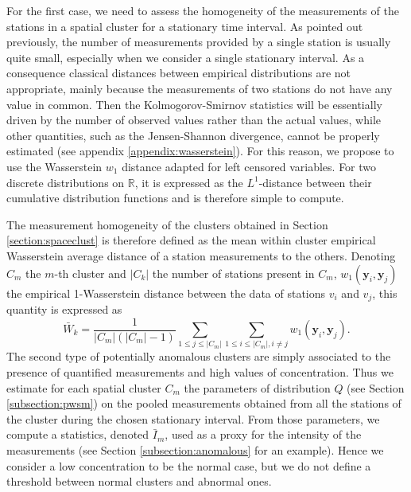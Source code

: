 For the first case, we need to assess the homogeneity of the measurements of the stations in a spatial cluster for a stationary time interval. As pointed out previously, the number of measurements provided by a single station is usually quite small, especially when we consider a single stationary interval. As a consequence classical distances between empirical distributions are not appropriate, mainly because the measurements of two stations do not have any value in common. Then the Kolmogorov-Smirnov statistics will be essentially driven by the number of observed values rather than the actual values, while other quantities, such as the Jensen-Shannon divergence, cannot be properly estimated (see appendix \ref{appendix:wasserstein}). For this reason, we propose to use the Wasserstein $w_1$ distance \cite{villani2009optimal} adapted for left censored variables. For two discrete distributions on $\mathbb{R}$, it is expressed as the $L^1$-distance between their cumulative distribution functions and is therefore simple to compute. 

The measurement homogeneity of the clusters obtained in Section \ref{section:spaceclust} is therefore defined as the mean within cluster empirical Wasserstein average distance of a station measurements to the others. Denoting $C_m$ the $m$-th cluster and $|C_k|$ the number of stations present in $C_m$, $w_1(\mathbf{y}_i,\mathbf{y}_j)$ the empirical 1-Wasserstein distance between the data of stations $v_i$ and $v_j$, this quantity is expressed as   
\begin{equation}
    \bar{W}_k = \frac{1}{|C_m|(|C_m|-1)}\sum_{1 \leq j \leq |C_m|}\sum_{1 \leq i \leq |C_m|, i \neq j}w_1(\mathbf{y}_i,\mathbf{y}_j).
\end{equation}
The second type of potentially anomalous clusters are simply associated to the presence of quantified measurements and high values of concentration. Thus we estimate for each spatial cluster $C_m$ the parameters of distribution $Q$ (see Section \ref{subsection:pwsm}) on the pooled measurements obtained from all the stations of the cluster during the chosen stationary interval. From those parameters, we compute a statistics, denoted $\bar{I}_m$, used as a proxy for the intensity of the measurements (see Section \ref{subsection:anomalous} for an example).  Hence we consider a low concentration to be the normal case, but we do not define a threshold between normal clusters and abnormal ones. 

